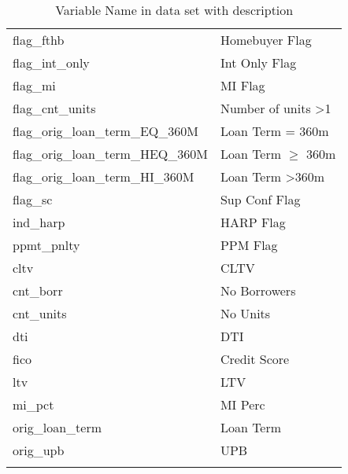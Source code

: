 \begin{longtable}{lp{8cm}}
flag\_fthb                         & Homebuyer Flag                                                       \\
flag\_int\_only                    & Int Only Flag                                                        \\
flag\_mi                           & MI Flag                                                              \\
flag\_cnt\_units                   & Number of units \textgreater 1                                       \\
flag\_orig\_loan\_term\_EQ\_360M   & Loan Term = 360m                                                     \\
flag\_orig\_loan\_term\_HEQ\_360M  & Loan Term $\geq$ 360m                                                \\
flag\_orig\_loan\_term\_HI\_360M   & Loan Term \textgreater 360m                                          \\\hline
flag\_sc                           & Sup Conf Flag                                                        \\
ind\_harp                          & HARP Flag                                                            \\
ppmt\_pnlty                        & PPM Flag                                                             \\\hline
cltv                               & CLTV                                                                 \\
cnt\_borr                          & No Borrowers                                                         \\
cnt\_units                         & No Units                                                             \\
dti                                & DTI                                                                  \\
fico                               & Credit Score                                                         \\
ltv                                & LTV                                                                  \\
mi\_pct                            & MI Perc                                                              \\
orig\_loan\_term                   & Loan Term                                                            \\
orig\_upb                          & UPB                                                                  \\\bottomrule

\caption{Variable Name in data set with description}
\end{longtable}

